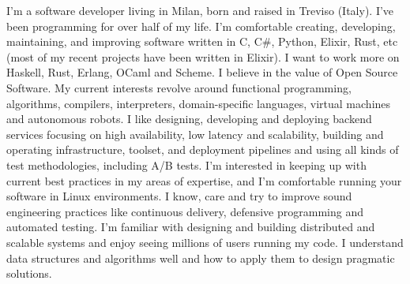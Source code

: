 \documentclass[9pt]{developercv}
\begin{document}
\begin{minipage}[t]{1.0\textwidth}
    \vspace{-\baselineskip}
    I'm a software developer living in Milan, born and raised in Treviso (Italy). I've been programming for over half of my life. I'm comfortable creating, developing, maintaining, and improving software written in C, C\#, Python, Elixir, Rust, etc (most of my recent projects have been written in Elixir). I want to work more on Haskell, Rust, Erlang, OCaml and Scheme. I believe in the value of Open Source Software. My current interests revolve around functional programming, algorithms, compilers, interpreters, domain-specific languages, virtual machines and autonomous robots. I like designing, developing and deploying backend services focusing on high availability, low latency and scalability, building and operating infrastructure, toolset, and deployment pipelines and using all kinds of test methodologies, including A/B tests. I'm interested in keeping up with current best practices in my areas of expertise, and I'm comfortable running your software in Linux environments. I know, care and try to improve sound engineering practices like continuous delivery, defensive programming and automated testing. I'm familiar with designing and building distributed and scalable systems and enjoy seeing millions of users running my code. I understand data structures and algorithms well and how to apply them to design pragmatic solutions.
\end{minipage}


\end{document}
